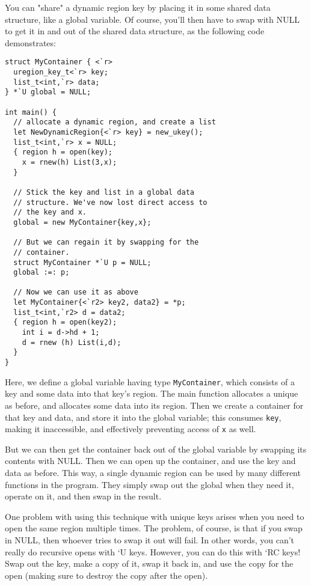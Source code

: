 You can "share" a dynamic region key by placing it in some shared data
structure, like a global variable.  Of course, you'll then have to swap with
NULL to get it in and out of the shared data structure, as the following
code demonstrates:
\begin{verbatim}
struct MyContainer { <`r>
  uregion_key_t<`r> key;
  list_t<int,`r> data;
} *`U global = NULL;

int main() {
  // allocate a dynamic region, and create a list
  let NewDynamicRegion{<`r> key} = new_ukey();
  list_t<int,`r> x = NULL;
  { region h = open(key);
    x = rnew(h) List(3,x);
  }

  // Stick the key and list in a global data
  // structure. We've now lost direct access to
  // the key and x.
  global = new MyContainer{key,x};

  // But we can regain it by swapping for the
  // container.
  struct MyContainer *`U p = NULL;
  global :=: p;

  // Now we can use it as above
  let MyContainer{<`r2> key2, data2} = *p;
  list_t<int,`r2> d = data2;
  { region h = open(key2);
    int i = d->hd + 1;
    d = rnew (h) List(i,d);
  }
}
\end{verbatim}
Here, we define a global variable having type \texttt{MyContainer}, which
consists of a key and some data into that key's region.  The main function
allocates a unique as before, and allocates some data into its region.  Then
we create a container for that key and data, and store it into the global
variable; this consumes \texttt{key}, making it inaccessible, and
effectively preventing access of \texttt{x} as well.

But we can then get the container back out of the global variable by
swapping its contents with NULL.  Then we can open up the container, and use
the key and data as before.  This way, a single dynamic region can be used
by many different functions in the program.  They simply swap out the global
when they need it, operate on it, and then swap in the result.

One problem with using this technique with unique keys arises when you need
to open the same region multiple times.  The problem, of course, is that if
you swap in NULL, then whoever tries to swap it out will fail.  In other
words, you can't really do recursive opens with `U keys.  However, you can
do this with `RC keys!  Swap out the key, make a copy of it, swap it back
in, and use the copy for the open (making sure to destroy the copy after the
open).
  
